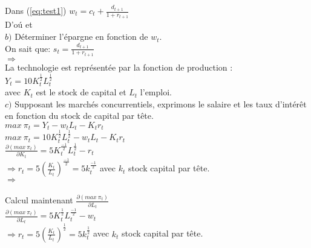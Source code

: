 \documentclass[11pt,twoside,a4paper]{article}
\begin{document}
Dans (\ref{eq:test1})\: $ w_t=c_t + \frac{d_{t+1}}{1+r_{t+1}}$ \\

D'o\'{u} \:
  \: et \: \\
 
 
 $b)$  Déterminer l'épargne en fonction de $w_t$.\\
 
 On sait que: $ s_t = \frac{d_{t+1}}{1+r_{t+1}} $\\
 
 $ \Rightarrow$   \\
 
 La technologie est représentée par la fonction de production :\\
 
 $Y_t=10K_t^{\frac{1}{2}}L_t^{\frac{1}{2}}$\\
 
 avec $K_t$ est le stock de capital et $L_t$ l'emploi.\\
 
 $c)$ Supposant les marchés concurrentiels, exprimons le salaire et les taux d'intér\^{e}t en fonction du stock de capital par t\^{e}te.\\

$ max\ \pi_t= Y_t -w_tL_t-K_t r_t $\\

 $ max\ \pi_t=10K_t^{\frac{1}{2}}L_t^{\frac{1}{2}}-w_tL_t-K_t r_t $\\
 
 $
  \frac{\partial (max\ \pi_t)}{\partial K_t}=5K_t^{\frac{-1}{2}}L_t^{\frac{1}{2}}-r_t $\\
 
$ \Rightarrow r_t= 5(\frac{K_t}{L_t})^{\frac{-1}{2}}=5k_t^{\frac{-1}{2}}$ \: avec $k_t$ stock capital par t\^{e}te.\\


 $ \Rightarrow$   \\
 \\Calcul maintenant $\frac{\partial (max\ \pi_t)}{\partial L_t}$\\
 
 $\frac{\partial (max\ \pi_t)}{\partial L_t}=5K_t^{\frac{1}{2}}L_t^{\frac{-1}{2}}-w_t$\\
 
 $ \Rightarrow r_t= 5(\frac{K_t}{L_t})^{\frac{1}{2}}=5k_t^{\frac{1}{2}}$ \: avec $k_t$ stock capital par t\^{e}te.\\
\end{document}

